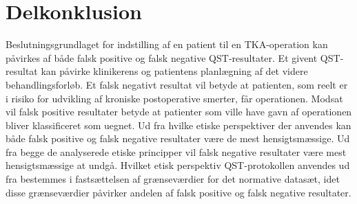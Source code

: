 \section{Delkonklusion}
Beslutningsgrundlaget for indstilling af en patient til en TKA-operation kan påvirkes af både falsk positive og falsk negative QST-resultater. Et givent QST-resultat kan påvirke klinikerens og patientens planlægning af det videre behandlingsforløb. Et falsk negativt resultat vil betyde at patienten, som reelt er i risiko for udvikling af kroniske postoperative smerter, får operationen. Modsat vil falsk positive resultater betyde at patienter som ville have gavn af operationen bliver klassificeret som uegnet. Ud fra hvilke etiske perspektiver der anvendes kan både falsk positive og falsk negative resultater være de mest hensigtsmæssige. Ud fra begge de analyserede etiske principper vil falsk negative resultater være mest hensigtsmæssige at undgå. Hvilket etisk perspektiv QST-protokollen anvendes ud fra bestemmes i fastsættelsen af grænseværdier for det normative datasæt, idet disse grænseværdier påvirker andelen af falsk positive og falsk negative resultater. 


